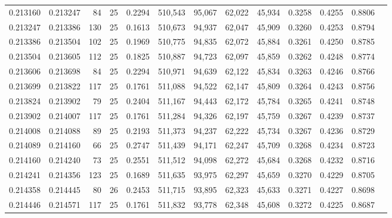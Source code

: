 \begin{tabular}{rrrrrrrrrrrrr}
0.213160 & 0.213247 &    84 &  25 &                                     0.2294 & 510,543 &  95,067 &  62,022 &  45,934 & 0.3258 & 0.4255 & 0.8806 \\
0.213247 & 0.213386 &   130 &  25 &                                     0.1613 & 510,673 &  94,937 &  62,047 &  45,909 & 0.3260 & 0.4253 & 0.8794 \\
0.213386 & 0.213504 &   102 &  25 &                                     0.1969 & 510,775 &  94,835 &  62,072 &  45,884 & 0.3261 & 0.4250 & 0.8785 \\
0.213504 & 0.213605 &   112 &  25 &                                     0.1825 & 510,887 &  94,723 &  62,097 &  45,859 & 0.3262 & 0.4248 & 0.8774 \\
0.213606 & 0.213698 &    84 &  25 &                                     0.2294 & 510,971 &  94,639 &  62,122 &  45,834 & 0.3263 & 0.4246 & 0.8766 \\
0.213699 & 0.213822 &   117 &  25 &                                     0.1761 & 511,088 &  94,522 &  62,147 &  45,809 & 0.3264 & 0.4243 & 0.8756 \\
0.213824 & 0.213902 &    79 &  25 &                                     0.2404 & 511,167 &  94,443 &  62,172 &  45,784 & 0.3265 & 0.4241 & 0.8748 \\
0.213902 & 0.214007 &   117 &  25 &                                     0.1761 & 511,284 &  94,326 &  62,197 &  45,759 & 0.3267 & 0.4239 & 0.8737 \\
0.214008 & 0.214088 &    89 &  25 &                                     0.2193 & 511,373 &  94,237 &  62,222 &  45,734 & 0.3267 & 0.4236 & 0.8729 \\
0.214089 & 0.214160 &    66 &  25 &                                     0.2747 & 511,439 &  94,171 &  62,247 &  45,709 & 0.3268 & 0.4234 & 0.8723 \\
0.214160 & 0.214240 &    73 &  25 &                                     0.2551 & 511,512 &  94,098 &  62,272 &  45,684 & 0.3268 & 0.4232 & 0.8716 \\
0.214241 & 0.214356 &   123 &  25 &                                     0.1689 & 511,635 &  93,975 &  62,297 &  45,659 & 0.3270 & 0.4229 & 0.8705 \\
0.214358 & 0.214445 &    80 &  26 &                                     0.2453 & 511,715 &  93,895 &  62,323 &  45,633 & 0.3271 & 0.4227 & 0.8698 \\
0.214446 & 0.214571 &   117 &  25 &                                     0.1761 & 511,832 &  93,778 &  62,348 &  45,608 & 0.3272 & 0.4225 & 0.8687 \\

\end{tabular}

